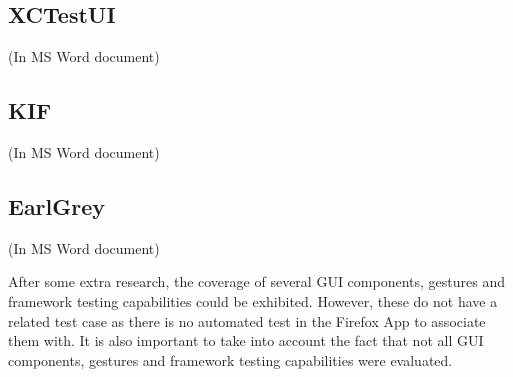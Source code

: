 	\subsection{XCTestUI}
	(In MS Word document)
	
	
	\subsection{KIF}
	(In MS Word document)
	
	
	\subsection{EarlGrey}
	(In MS Word document)

After some extra research, the coverage of several GUI components, gestures and framework testing capabilities could be exhibited. However, these do not have a related test case as there is no automated test in the Firefox App to associate them with. It is also important to take into account the fact that not all GUI components, gestures and framework testing capabilities were evaluated.



	

